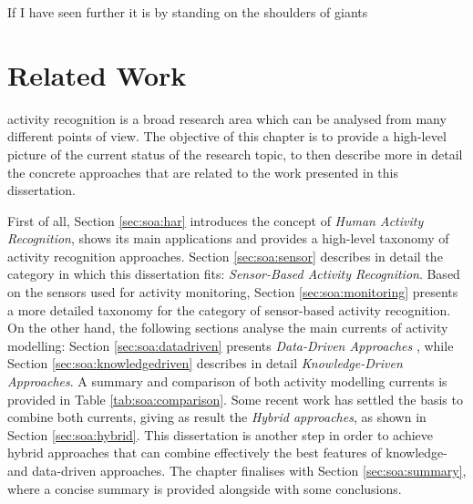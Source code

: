 

\begin{savequote}[50mm]
If I have seen further it is by standing on the shoulders of giants
\end{savequote}

\chapter{Related Work}
\label{cha:soa}

\ifpdf
    \graphicspath{{2_state_of_the_art/figures/PDF/}{2_state_of_the_art/figures/PNG/}{2_state_of_the_art/figures/}}
\else
    \graphicspath{{2_state_of_the_art/figures/EPS/}{2_state_of_the_art/figures/}}
\fi


 activity recognition is a broad research area which can be analysed from many different points of view. The objective of this chapter is to provide a high-level picture of the current status of the research topic, to then describe more in detail the concrete approaches that are related to the work presented in this dissertation. 

First of all, Section \ref{sec:soa:har} introduces the concept of \textit{Human Activity Recognition}, shows its main applications and provides a high-level taxonomy of activity recognition approaches. Section \ref{sec:soa:sensor} describes in detail the category in which this dissertation fits: \textit{Sensor-Based Activity Recognition}. Based on the sensors used for activity monitoring, Section \ref{sec:soa:monitoring} presents a more detailed taxonomy for the category of sensor-based activity recognition. On the other hand, the following sections analyse the main currents of activity modelling: Section \ref{sec:soa:datadriven} presents \textit{Data-Driven Approaches} , while Section \ref{sec:soa:knowledgedriven} describes in detail \textit{Knowledge-Driven Approaches}. A summary and comparison of both activity modelling currents is provided in Table \ref{tab:soa:comparison}. Some recent work has settled the basis to combine both currents, giving as result the \textit{Hybrid approaches}, as shown in Section \ref{sec:soa:hybrid}. This dissertation is another step in order to achieve hybrid approaches that can combine effectively the best features of knowledge- and data-driven approaches. The chapter finalises with Section \ref{sec:soa:summary}, where a concise summary is provided alongside with some conclusions.
